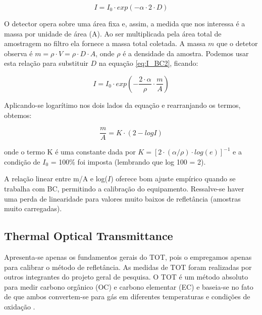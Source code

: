 \begin{equation}
  \label{eq:I_BC2}
  I = I_0 \cdot exp(-\alpha \cdot 2 \cdot D)
\end{equation}

O detector opera sobre uma área fixa e, assim, a medida que nos interessa é a 
massa por unidade de área (A). Ao ser multiplicada pela área total de amostragem
no filtro ela fornece a massa total coletada. A massa $m$ que o detetor observa 
é $m = \rho \cdot V = \rho \cdot D \cdot A$, onde $\rho$ é a densidade da amostra. 
Podemos usar esta relação para substituir $D$ na equação \ref{eq:I_BC2}, 
ficando:

\begin{equation}
  \label{m/a}
  I = I_0 \cdot exp \left( -\frac{2 \cdot \alpha}{\rho} \cdot \frac{m}{A} \right)
\end{equation}

Aplicando-se logarítimo nos dois lados da equação e rearranjando os termos, 
obtemos:

\begin{equation}
  \label{m/a_2}
  \frac{m}{A} = K \cdot (2-logI) 
\end{equation}

onde o termo K é uma constante dada por $K = [2 \cdot ({\alpha}/{\rho}) \cdot log(e)]^{-1}$ e
a condição de $I_0$ = 100\% foi imposta (lembrando que log 100 = 2).

A relação linear entre m/A e log($I$) oferece bom ajuste empírico 
quando se trabalha com BC, permitindo a calibração do equipamento. 
Ressalve-se haver uma perda de linearidade para valores muito baixos de 
refletância (amostras muito carregadas).  

\subsection{Thermal Optical Transmittance}

Apresenta-se apenas os fundamentos gerais do TOT, pois o empregamos apenas para
calibrar o método de refletância. As medidas de TOT foram realizadas por outros
integrantes do projeto geral de pesquisa.
O TOT é um método absoluto para medir carbono orgânico (OC) e 
carbono elementar (EC) e baseia-se no fato de que ambos convertem-se para gás 
em diferentes temperaturas e condições de oxidação \citep{birch1998}.

